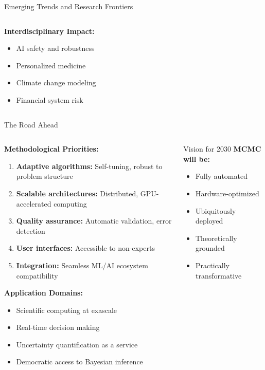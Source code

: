 \documentclass[aspectratio=169,11pt]{beamer}
\begin{document}
\begin{frame}{Emerging Trends and Research Frontiers}
\begin{columns}
\begin{column}{0.5\textwidth}
\vspace{0.3cm}
\textbf{Interdisciplinary Impact:}
\begin{itemize}
\item AI safety and robustness
\item Personalized medicine
\item Climate change modeling
\item Financial system risk
\end{itemize}
\end{column}
\end{columns}
\end{frame}

\begin{frame}{The Road Ahead}
\begin{columns}
\begin{column}{0.6\textwidth}
\textbf{Methodological Priorities:}
\begin{enumerate}
\item \textbf{Adaptive algorithms:} Self-tuning, robust to problem structure
\item \textbf{Scalable architectures:} Distributed, GPU-accelerated computing
\item \textbf{Quality assurance:} Automatic validation, error detection
\item \textbf{User interfaces:} Accessible to non-experts
\item \textbf{Integration:} Seamless ML/AI ecosystem compatibility
\end{enumerate}

\vspace{0.3cm}
\textbf{Application Domains:}
\begin{itemize}
\item Scientific computing at exascale
\item Real-time decision making
\item Uncertainty quantification as a service
\item Democratic access to Bayesian inference
\end{itemize}
\end{column}
\begin{column}{0.4\textwidth}
\begin{alertblock}{Vision for 2030}
\textbf{MCMC will be:}
\begin{itemize}
\item Fully automated
\item Hardware-optimized
\item Ubiquitously deployed
\item Theoretically grounded
\item Practically transformative
\end{itemize}
\end{alertblock}


\end{column}
\end{columns}
\end{frame}
\end{document}
